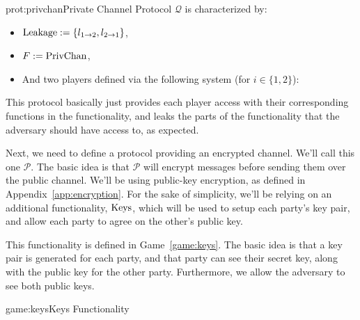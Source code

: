 \begin{protocol}{prot:privchan}{Private Channel Protocol}
    $\mathscr{Q}$ is characterized by:
    \begin{itemize}
        \item $\text{Leakage} := \{l_{1\to 2}, l_{2\to1}\}$,
        \item $F := \text{PrivChan}$,
        \item And two players defined via the following system (for $i \in \{1, 2\}$):
    \end{itemize}

\end{protocol}

This protocol basically just provides each player access with their corresponding
functions in the functionality, and leaks the parts of the functionality
that the adversary should have access to, as expected.

Next, we need to define a protocol providing an encrypted channel.
We'll call this one $\mathscr{P}$.
The basic idea is that $\mathscr{P}$ will encrypt messages before sending
them over the public channel.
We'll be using public-key encryption, as defined in Appendix~\ref{app:encryption}.
For the sake of simplicity, we'll be relying on an additional functionality,
$\text{Keys}$, which will be used to setup each party's key pair, and allow
each party to agree on the other's public key.

This functionality is defined in Game~\ref{game:keys}.
The basic idea is that a key pair is generated for each party,
and that party can see their secret key, along with the public key for the other party.
Furthermore, we allow the adversary to see both public keys.

\begin{game}{game:keys}{Keys Functionality}
\end{game}

